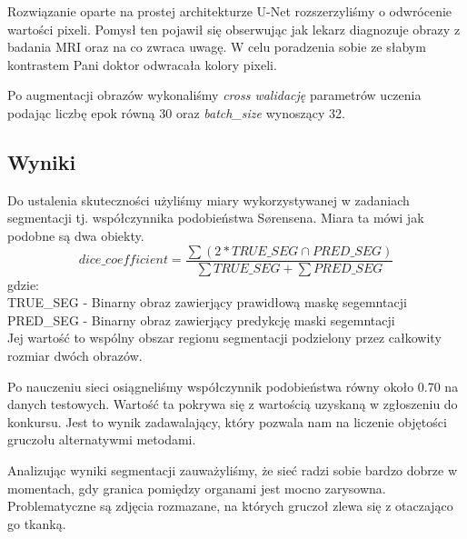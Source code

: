 \documentclass[a4paper,11pt,twoside]{report}
\theoremstyle{definition}
\begin{document}
Rozwiązanie oparte na prostej architekturze U-Net rozszerzyliśmy o odwrócenie wartości pixeli. Pomysł ten pojawił się obserwując jak lekarz diagnozuje obrazy z badania MRI oraz na co zwraca uwagę. W celu poradzenia sobie ze słabym kontrastem Pani doktor odwracała kolory pixeli.

Po augmentacji obrazów wykonaliśmy \textit{cross walidację} parametrów uczenia podając liczbę epok równą 30 oraz \textit{batch\_size} wynoszący 32.

\subsection{Wyniki}

Do ustalenia skuteczności użyliśmy miary wykorzystywanej w zadaniach segmentacji tj. współczynnika podobieństwa Sørensena. Miara ta mówi jak podobne są dwa obiekty. 
\[dice\_coefficient =  \dfrac { \sum (2 * TRUE\_SEG \cap PRED\_SEG) }  { \sum TRUE\_SEG +  \sum PRED\_SEG} \]
gdzie: \\
TRUE\_SEG - Binarny obraz zawierjący prawidłową maskę segemntacji \\
PRED\_SEG - Binarny obraz zawierjący predykcję maski segemntacji \\
Jej wartość to wspólny obszar regionu segmentacji podzielony przez całkowity rozmiar dwóch obrazów.


Po nauczeniu sieci osiągneliśmy współczynnik podobieństwa równy około 0.70 na danych testowych. Wartość ta pokrywa się z wartością uzyskaną w zgłoszeniu do konkursu. Jest to wynik zadawalający, który pozwala nam na liczenie objętości gruczołu alternatywmi metodami.

\par

Analizując wyniki segmentacji zauważyliśmy, że sieć radzi sobie bardzo dobrze w momentach, gdy granica pomiędzy organami jest mocno zarysowna. Problematyczne są zdjęcia rozmazane, na których gruczoł zlewa się z otaczająco go tkanką.
\end{document}

